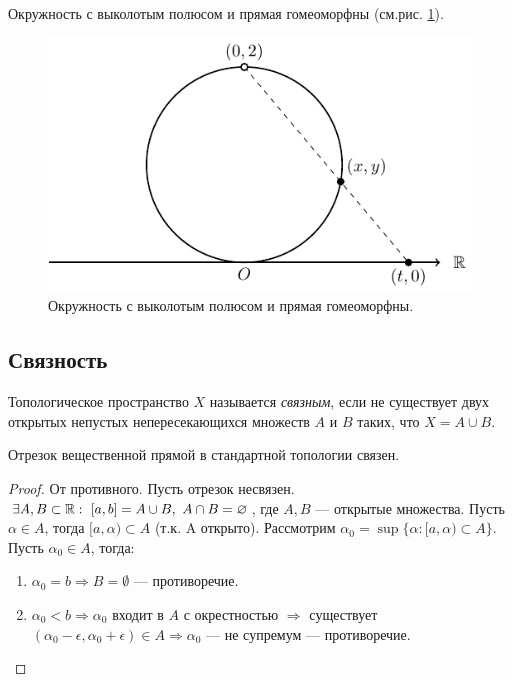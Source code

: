 
\begin{example}
    Окружность с выколотым полюсом и прямая гомеоморфны (см.рис. \ref{fig:c1.1}).
\end{example}

\begin{figure}
    \centering
    \includegraphics{images/c1.1.pdf}
    \caption{Окружность с выколотым полюсом и прямая гомеоморфны.}
    \label{fig:c1.1}
\end{figure}


\subsection{Связность}
\begin{definition}
    Топологическое пространство $X$ называется \textit{связным}, если не существует двух открытых непустых непересекающихся множеств $A$ и $B$ таких, что $X = A \cup B$.
\end{definition}

\begin{statement}
    Отрезок вещественной прямой в стандартной топологии связен.
\end{statement}
\begin{proof}
    От противного. Пусть отрезок несвязен. $\exists A, B \subset \mathbb{R}: \ [a, b] = A \cup B, \ A \cap B = \varnothing$, где $A, B$ — открытые множества. Пусть $\alpha \in A$, тогда $[a, \alpha) \subset A$ (т.к. A открыто). Рассмотрим $\alpha_0 = \sup\{ {\alpha}: [a, \alpha) \subset A\}$. \\
    Пусть $\alpha_0 \in A$, тогда:
    \begin{enumerate}
        \item $\alpha_0 = b \Rightarrow B = \emptyset$ — противоречие.
        \item $\alpha_0 < b \Rightarrow \alpha_0$ входит в $A$ с окрестностью $\Rightarrow$ существует $(\alpha_0 - \epsilon, \alpha_0 + \epsilon) \in A \Rightarrow \alpha_0$ — не супремум — противоречие.
    \end{enumerate}
\end{proof}

